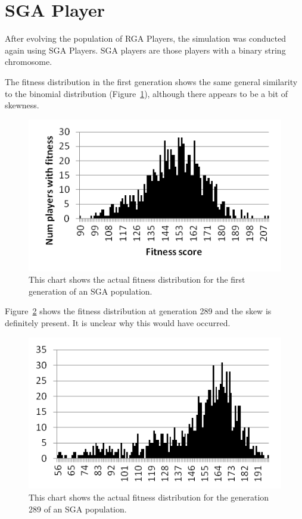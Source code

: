 \section{SGA Player}

After evolving the population of RGA Players, the simulation was conducted again
using SGA Players. SGA players are those players with a binary string
chromosome.

The fitness distribution in the first generation shows the same general
similarity to the binomial distribution (Figure~\ref{figure-sga_gen0}), although
there appears to be a bit of skewness.

\begin{figure}[htp]
\centerline{\includegraphics[width=1.0\columnwidth]{Figures/sga_gen0.png}}
\caption[SGA Fitness Generation 0]{This chart shows the actual fitness
distribution for the first generation of an SGA population.}
\label{figure-sga_gen0}
\end{figure}

Figure~\ref{figure-sga_gen289} shows the fitness distribution at generation 289
and the skew is definitely present. It is unclear why this would have occurred.

\begin{figure}[htp]
\centerline{\includegraphics[width=1.0\columnwidth]{Figures/sga_gen289.png}}
\caption[SGA Fitness Generation 289]{This chart shows the actual fitness
distribution for the generation 289 of an SGA population.}
\label{figure-sga_gen289}
\end{figure}

